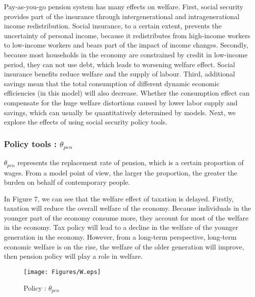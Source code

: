 \documentclass{article}
\begin{document}
        Pay-as-you-go pension system has many effects on welfare. First, social security provides part of the insurance through intergenerational and intragenerational income redistribution. Social insurance, to a certain extent, prevents the uncertainty of personal income, because it redistributes from high-income workers to low-income workers and bears part of the impact of income changes. Secondly, because most households in the economy are constrained by credit in low-income period, they can not use debt, which leads to worsening welfare effect. Social insurance benefits reduce welfare and the supply of labour. Third, additional savings mean that the total consumption of different dynamic economic efficiencies (in this model) will also decrease. Whether the consumption effect can compensate for the huge welfare distortions caused by lower labor supply and savings, which can usually be quantitatively determined by models.
        Next, we explore the effects of using social security policy tools.
        \subsubsection{Policy tools : $\theta_{pen}$}
            $\theta_{pen}$ represents the replacement rate of pension, which is a certain proportion of wages. From a model point of view, the larger the proportion, the greater the burden on behalf of contemporary people.
        
            In Figure 7, we can see that the welfare effect of taxation is delayed. Firstly, taxation will reduce the overall welfare of the economy. Because individuals in the younger part of the economy consume more, they account for most of the welfare in the economy. Tax policy will lead to a decline in the welfare of the younger generation in the economy. However, from a long-term perspective, long-term economic welfare is on the rise, the welfare of the older generation will improve, then pension policy will play a role in welfare.
            \begin{figure}[H]
                \centering
                \texttt{[image: Figures/W.eps]}
                \caption{Policy : $\theta_{pen}$}
            \end{figure}
\end{document}
